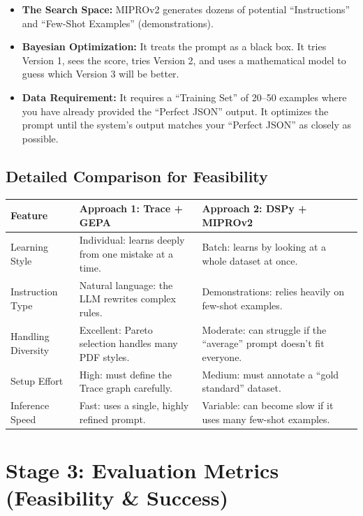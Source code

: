 \documentclass[11pt,a4paper]{article}
\begin{document}
\begin{itemize}
  \item \textbf{The Search Space:} MIPROv2 generates dozens of potential ``Instructions'' and ``Few-Shot Examples'' (demonstrations).
  \item \textbf{Bayesian Optimization:} It treats the prompt as a black box. It tries Version 1, sees the score, tries Version 2, and uses a mathematical model to guess which Version 3 will be better.
  \item \textbf{Data Requirement:} It requires a ``Training Set'' of 20--50 examples where you have already provided the ``Perfect JSON'' output. It optimizes the prompt until the system's output matches your ``Perfect JSON'' as closely as possible.
\end{itemize}

\subsection{Detailed Comparison for Feasibility}

\begin{center}
\begin{tabular}{@{}lll@{}}
\toprule
\textbf{Feature} & \textbf{Approach 1: Trace + GEPA} & \textbf{Approach 2: DSPy + MIPROv2} \\
\midrule
Learning Style & Individual: learns deeply from one mistake at a time. & Batch: learns by looking at a whole dataset at once. \\
Instruction Type & Natural language: the LLM rewrites complex rules. & Demonstrations: relies heavily on few-shot examples. \\
Handling Diversity & Excellent: Pareto selection handles many PDF styles. & Moderate: can struggle if the ``average'' prompt doesn't fit everyone. \\
Setup Effort & High: must define the Trace graph carefully. & Medium: must annotate a ``gold standard'' dataset. \\
Inference Speed & Fast: uses a single, highly refined prompt. & Variable: can become slow if it uses many few-shot examples. \\
\bottomrule
\end{tabular}
\end{center}

\section{Stage 3: Evaluation Metrics (Feasibility \& Success)}
\end{document}
